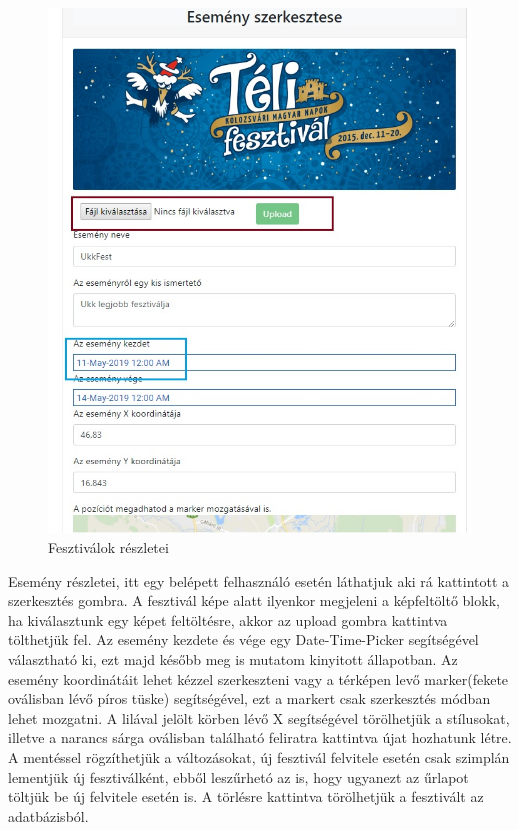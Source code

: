 \begin{figure}
\centering
\includegraphics[scale=0.8]{kepek/eventDet.jpg}
\caption{Fesztiválok részletei}
\label{fig:event1Det}
\end{figure}

Esemény részletei, itt egy belépett felhasználó esetén láthatjuk aki rá kattintott a szerkesztés gombra. A fesztivál képe alatt ilyenkor megjeleni a képfeltöltő blokk, ha kiválasztunk egy képet feltöltésre, akkor az upload gombra kattintva tölthetjük fel. Az esemény kezdete és vége egy Date-Time-Picker segítségével választható ki, ezt majd később meg is mutatom kinyitott állapotban.  Az esemény koordinátáit lehet kézzel szerkeszteni vagy a térképen levő marker(fekete oválisban lévő píros tüske) segítségével, ezt a markert csak szerkesztés módban lehet mozgatni.  A lilával jelölt körben lévő X segítségével törölhetjük a stílusokat, illetve a narancs sárga oválisban található feliratra kattintva újat hozhatunk létre. A mentéssel rögzíthetjük a változásokat, új fesztivál felvitele esetén csak szimplán lementjük új fesztiválként, ebből leszűrhetó az is, hogy ugyanezt az űrlapot töltjük be új felvitele esetén is. A törlésre kattintva törölhetjük a fesztivált az adatbázisból. 


